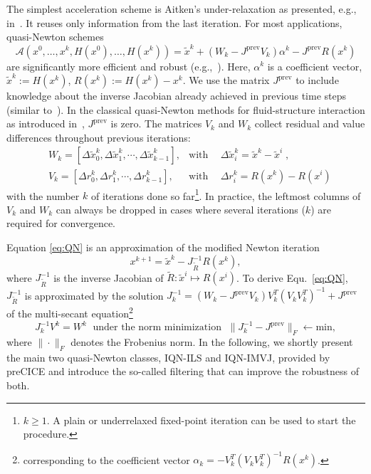 The simplest acceleration scheme is Aitken's under-relaxation as presented, e.g., in~\cite{Kuettler2008}.
It reuses only information from the last iteration. For most applications, quasi-Newton schemes  
\begin{equation}
\mathcal{A}(x^0,\ldots, x^k, H(x^0), \ldots, H(x^k)) = \tilde{x}^k + \left( W_k - J^{\text{prev}} V_k\right) \alpha^k - J^{\text{prev}} R(x^k) \label{eq:QN}
\end{equation}
are significantly more efficient and robust (e.g.,~\cite{Uekermann2016}). Here, $\alpha^k$ is a coefficient vector, $\tilde{x}^k := H(x^k)$, $R(x^k) := H(x^k)-x^k$.
We use the matrix $J^{\text{prev}}$ to include knowledge about the inverse Jacobian already achieved in previous time steps (similar to~\cite{Bogaers2014_MVQN}).
In the classical quasi-Newton methods for fluid-structure interaction as introduced in~\cite{Degroote2009}, $J^{\text{prev}}$ is zero. 
The matrices $V_k$ and $W_k$ collect residual and value differences throughout previous iterations:
\begin{eqnarray*}
  ~~~~~ W_k = \left[\Delta \tilde{x}^k_0, \Delta
  \tilde{x}^k_{1}, \cdots , \Delta \tilde{x}^k_{k-1}\right],   &\mbox{with}
                                                               ~~  &\Delta \tilde{x}^k_i = \tilde{x}^k - \tilde{x}^i \;,\\
  ~~~~~ V_k = \left[\Delta r^k_0, \Delta r^k_{1}, \cdots
  , \Delta r^k_{k-1}\right],   &\mbox{with} ~~  &\Delta r^k_i = R(x^k) -
                                                  R(x^i)\;
\end{eqnarray*} 
with the number $k$ of iterations done so far\footnote{$k\geq 1$. A plain or underrelaxed fixed-point iteration can be used to start the procedure.}. 
In practice, the leftmost columns of $V_k$ and $W_k$ can always be dropped in cases where several iterations ($k$) are required for convergence.

Equation \eqref{eq:QN} is an approximation of the modified Newton iteration
\[ x^{k+1} = \tilde{x}^k - J_{\tilde{R}}^{-1} R(x^k), \]
where $J^{-1}_{\tilde{R}}$ is the inverse Jacobian of $\tilde{R}: \tilde{x}^i \mapsto R(x^i)$. To derive Equ.~\eqref{eq:QN}, $J^{-1}_{\tilde{R}}$ is approximated by the solution $J_k^{-1} = (W_k - J^{\text{prev}} V_k) V_k^T (V_k V_k^T)^{-1} + J^{\text{prev}}$ of the multi-secant equation\footnote{corresponding to the coefficient vector $\alpha_k = - V_k^T (V_k V_k^T)^{-1} R(x^k)$.}
\begin{equation}
J_k^{-1} V^k = W^k \; \mbox{ under the norm minimization } \; \| J_k^{-1} - J^{\text{prev}} \|_F \leftarrow \text{min}, \label{eq:multi_secant}
\end{equation}
where $\| \cdot \|_F$ denotes the Frobenius norm. In the following, we shortly present the main two quasi-Newton classes, IQN-ILS and IQN-IMVJ, provided by preCICE and introduce the so-called filtering that can improve the robustness of both. 

